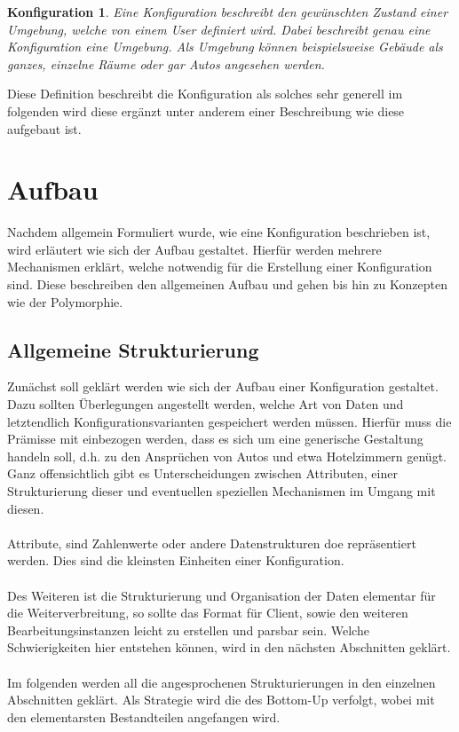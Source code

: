 \newtheorem{mydef}{Konfiguration}
\begin{mydef}
Eine Konfiguration beschreibt den gewünschten Zustand einer Umgebung, welche von einem User definiert wird. Dabei beschreibt genau eine Konfiguration eine Umgebung. Als
Umgebung können beispielsweise Gebäude als ganzes, einzelne Räume oder gar Autos angesehen werden.
\end{mydef}

Diese Definition beschreibt die Konfiguration als solches sehr generell im folgenden wird diese ergänzt unter anderem einer Beschreibung wie diese aufgebaut ist. 

\section{Aufbau}
Nachdem allgemein Formuliert wurde, wie eine Konfiguration beschrieben ist, wird erläutert wie sich der Aufbau gestaltet. Hierfür werden mehrere Mechanismen erklärt, welche notwendig für die Erstellung einer Konfiguration sind. Diese beschreiben den allgemeinen Aufbau und gehen bis hin zu Konzepten wie der Polymorphie. 

\subsection{Allgemeine Strukturierung}
Zunächst soll geklärt werden wie sich der Aufbau einer Konfiguration gestaltet. Dazu sollten Überlegungen angestellt werden, welche Art von Daten und letztendlich Konfigurationsvarianten gespeichert werden müssen. Hierfür muss die Prämisse mit einbezogen werden, dass es sich um eine generische Gestaltung handeln soll, d.h. zu den Ansprüchen von Autos und etwa Hotelzimmern genügt. 
Ganz offensichtlich gibt es Unterscheidungen zwischen Attributen, einer Strukturierung dieser und eventuellen speziellen Mechanismen im Umgang mit diesen.
\\\\
Attribute, sind Zahlenwerte oder andere Datenstrukturen doe repräsentiert werden. Dies sind die kleinsten Einheiten einer Konfiguration.
\\\\
Des Weiteren ist die Strukturierung und Organisation der Daten elementar für die Weiterverbreitung, so sollte das Format für Client, sowie den weiteren Bearbeitungsinstanzen leicht zu erstellen und parsbar sein. Welche Schwierigkeiten hier entstehen können, wird in den nächsten Abschnitten geklärt. 
\\\\
Im folgenden werden all die angesprochenen Strukturierungen in den einzelnen Abschnitten geklärt. Als Strategie wird die des Bottom-Up verfolgt, wobei mit den elementarsten Bestandteilen angefangen wird. 

